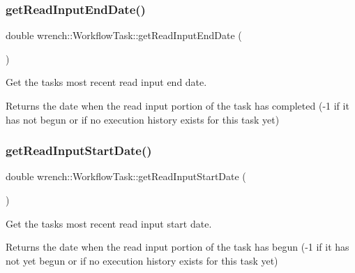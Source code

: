 \subsubsection{\texorpdfstring{get\+Read\+Input\+End\+Date()}{getReadInputEndDate()}}
{\footnotesize\ttfamily double wrench\+::\+Workflow\+Task\+::get\+Read\+Input\+End\+Date (\begin{DoxyParamCaption}{ }\end{DoxyParamCaption})}



Get the task\textquotesingle{}s most recent read input end date. 

\begin{DoxyReturn}{Returns}
the date when the read input portion of the task has completed (-\/1 if it has not begun or if no execution history exists for this task yet) 
\end{DoxyReturn}
\mbox{\label{classwrench_1_1_workflow_task_a752f0e9cf1bcab72e41de185931dbf9a}} 
\subsubsection{\texorpdfstring{get\+Read\+Input\+Start\+Date()}{getReadInputStartDate()}}
{\footnotesize\ttfamily double wrench\+::\+Workflow\+Task\+::get\+Read\+Input\+Start\+Date (\begin{DoxyParamCaption}{ }\end{DoxyParamCaption})}



Get the task\textquotesingle{}s most recent read input start date. 

\begin{DoxyReturn}{Returns}
the date when the read input portion of the task has begun (-\/1 if it has not yet begun or if no execution history exists for this task yet) 
\end{DoxyReturn}
\mbox{\label{classwrench_1_1_workflow_task_a17462dd156a6080653f96a1abbbb379d}} 
